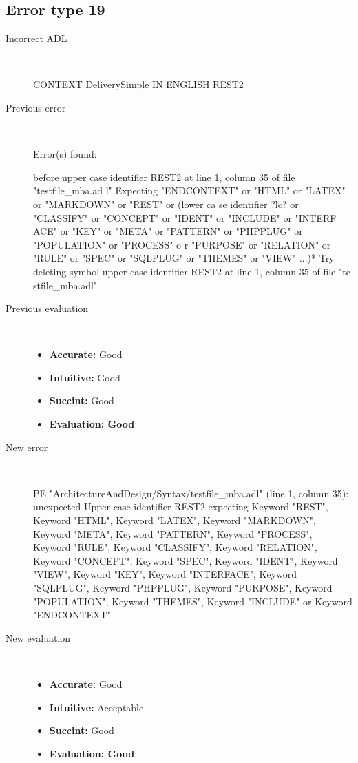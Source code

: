 \subsection{Error type 19}
  \begin{description}
  \item[Incorrect ADL]~\\
\begin{adl}
CONTEXT DeliverySimple IN ENGLISH REST2\end{adl}
  \item[Previous error]~\\
\begin{haskell}
Error(s) found:

before upper case identifier REST2 at line 1, column 35 of file "testfile_mba.ad
l"
Expecting "ENDCONTEXT" or "HTML" or "LATEX" or "MARKDOWN" or "REST" or (lower ca
se identifier ?lc? or "CLASSIFY" or "CONCEPT" or "IDENT" or "INCLUDE" or "INTERF
ACE" or "KEY" or "META" or "PATTERN" or "PHPPLUG" or "POPULATION" or "PROCESS" o
r "PURPOSE" or "RELATION" or "RULE" or "SPEC" or "SQLPLUG" or "THEMES" or "VIEW"
 ...)*
Try deleting symbol upper case identifier REST2 at line 1, column 35 of file "te
stfile_mba.adl"\end{haskell}
  \item[Previous evaluation]~\\
    \begin{itemize}
    \item \textbf{Accurate:} Good
    \item \textbf{Intuitive:} Good
    \item \textbf{Succint:} Good
    \item \textbf{Evaluation: Good}
    \end{itemize}
  \item[New error]~\\
\begin{haskell}
PE "ArchitectureAndDesign/Syntax/testfile_mba.adl" (line 1, column 35):
unexpected Upper case identifier REST2
expecting Keyword "REST", Keyword "HTML", Keyword "LATEX", Keyword "MARKDOWN", Keyword "META", Keyword "PATTERN", Keyword "PROCESS", Keyword "RULE", Keyword "CLASSIFY", Keyword "RELATION", Keyword "CONCEPT", Keyword "SPEC", Keyword "IDENT", Keyword "VIEW", Keyword "KEY", Keyword "INTERFACE", Keyword "SQLPLUG", Keyword "PHPPLUG", Keyword "PURPOSE", Keyword "POPULATION", Keyword "THEMES", Keyword "INCLUDE" or Keyword "ENDCONTEXT"
\end{haskell}
  \item[New evaluation]~\\
    \begin{itemize}
    \item \textbf{Accurate:} Good
    \item \textbf{Intuitive:} Acceptable
    \item \textbf{Succint:} Good
    \item \textbf{Evaluation: Good
}
    \end{itemize}
  \end{description}

